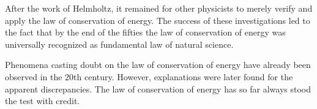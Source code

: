 After the work of Helmholtz, it remained for other physicists to merely verify and apply the law of conserva­tion of energy. The success of these investigations led to the fact that by the end of the fifties the law of con­servation of energy was universally recognized as fundamental law of natural science.

Phenomena casting doubt on the law of conservation of energy have already been observed in the 20th century. However, explanations were later found for the apparent discrepancies. The law of conservation of energy has so far always stood the test with credit.




